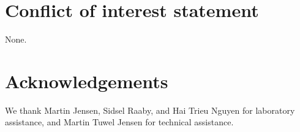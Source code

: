 \documentclass[preprint,5p,times,11pt]{elsarticle}
\begin{document}
\section{Conflict of interest statement}
None.



\section{Acknowledgements}
We thank Martin Jensen, Sidsel Raaby, and Hai Trieu Nguyen for laboratory assistance, and Martin Tuwel Jensen for technical assistance.





 




%
\end{document}
